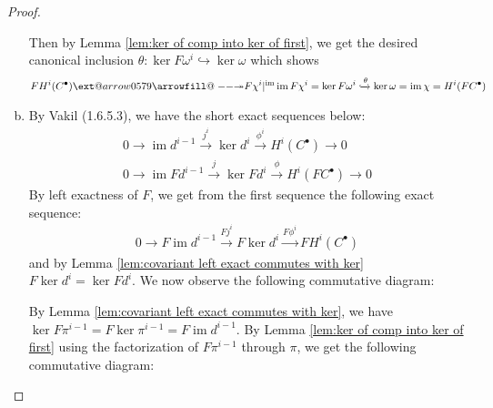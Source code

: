 \documentclass{article}
\makeatletter
\DeclareMathOperator{\im}{im}
\DeclareMathOperator{\cok}{cok}
\newcommand\xtwoheadrightarrow[2][]{%
  \ext@arrow 0579{\twoheadrightarrowfill@}{#1}{#2}}
\newcommand\twoheadrightarrowfill@{%
  \arrowfill@\relbar\relbar\twoheadrightarrow}
\makeatother
\begin{document}
\begin{proof}
\begin{enumerate}[(a)]
\begin{center}
   \end{center}
   Then by Lemma \ref{lem:ker of comp into ker of first}, we get the desired canonical inclusion $\theta:\ker F\omega^i \hookrightarrow \ker \omega$
    which shows
    \begin{align*}
        FH^i(C^\bullet)\xtwoheadrightarrow{F\chi^i\vert^{\im}} \im F\chi^i=\ker F\omega^i \xhookrightarrow{\theta} \ker \omega=\im \chi=H^i(FC^\bullet)
    \end{align*}
    \item 
    By Vakil (1.6.5.3), we have the short exact sequences below:
    \begin{align*}
        0\rightarrow \im d^{i-1}\xrightarrow{j^i} \ker d^i \xrightarrow{\phi^i} H^i(C^\bullet)\rightarrow0\\
        0\rightarrow \im Fd^{i-1}\xrightarrow{j} \ker Fd^i \xrightarrow{\phi} H^i(FC^\bullet)\rightarrow0
    \end{align*}
    By left exactness of $F$, we get from the first sequence the following exact sequence:
    \begin{align*}
        0\rightarrow F\im d^{i-1}\xrightarrow{Fj^i} F\ker d^i \xrightarrow{F\phi^i} FH^i(C^\bullet)
    \end{align*}
    and by Lemma \ref{lem:covariant left exact commutes with ker} $F\ker d^i=\ker Fd^i$. We now observe the following commutative diagram:
    \begin{center}
    \end{center}
    By Lemma \ref{lem:covariant left exact commutes with ker}, we have $\ker F\pi^{i-1}= F\ker \pi^{i-1}=F\im d^{i-1}$. By Lemma \ref{lem:ker of comp into ker of first} using the factorization of $F\pi^{i-1}$ through $\pi$, we get the following commutative diagram:
    \begin{center}
\end{center}
\end{enumerate}
\end{proof}
\end{document}
